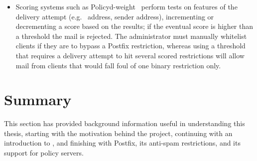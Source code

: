 \begin{itemize}

    \item Scoring systems such as Policyd-weight~\cite{policyd-weight}
        perform tests on features of the delivery attempt (e.g.\
         address, sender address), incrementing or decrementing
        a score based on the results; if the eventual score is higher than
        a threshold the mail is rejected.  The administrator must manually
        whitelist clients if they are to bypass a Postfix restriction,
        whereas using a threshold that requires a delivery attempt to hit
        several scored restrictions will allow mail from clients that would
        fall foul of one binary restriction only.

\end{itemize}

\section{Summary}

This section has provided background information useful in understanding
this thesis, starting with the motivation behind the project, continuing
with an introduction to \acronym{SMTP}, and finishing with Postfix, its
anti-spam restrictions, and its support for policy servers.
